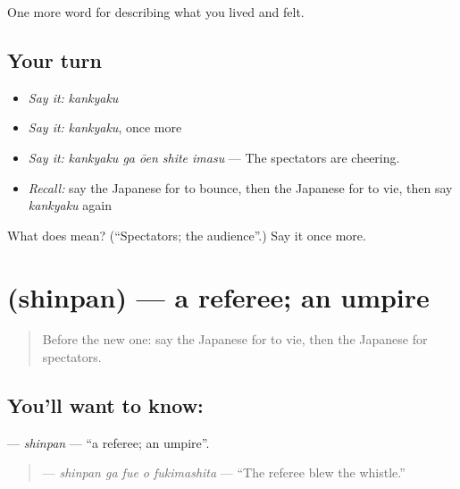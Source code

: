 \begin{grammarlens}[title={What you've built}]
One more word for describing what you lived and felt.
\end{grammarlens}

\subsection*{Your turn}
\begin{itemize}
\raggedright
  \item \emph{Say it:} \emph{kankyaku}
  \item \emph{Say it:} \emph{kankyaku}, once more
  \item \emph{Say it:} \emph{kankyaku ga ōen shite imasu} — The spectators are cheering.
  \item \emph{Recall:} say the Japanese for to bounce, then the Japanese for to vie, then say \emph{kankyaku} again
\end{itemize}

\begin{tcolorbox}[breakable,colback=teal!4,colframe=teal!35!black,title={Before you move on}]
What does  mean? (\textquotedblleft{}Spectators; the audience\textquotedblright{}.) Say it once more.
\end{tcolorbox}
\section[\texorpdfstring{\ja{しんぱん} (shinpan)}{しんぱん (shinpan)}]{ (shinpan) — a referee; an umpire}

\label{lesson:JA-C464-shinpan}



\begin{quote}
Before the new one: say the Japanese for to vie, then the Japanese for spectators.
\end{quote}

\subsection*{You'll want to know: }
\textbf{} — \emph{shinpan} — \textquotedblleft{}a referee; an umpire\textquotedblright{}.

\begin{quote}
\textbf{  } — \emph{shinpan ga fue o fukimashita} — \textquotedblleft{}The referee blew the whistle.\textquotedblright{}
\end{quote}

